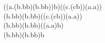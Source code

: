 \documentclass{article}
\begin{document}
\begin{flushleft}

((\lambda a.(\lambda b.b\:b)\:(\lambda b.b\:b))\:b)\:((\lambda c.(c\:b))\:(\lambda a.a)) \rightarrow \\ 
(\lambda b.b\:b)\:(\lambda b.b\:b)\:((\lambda c.(c\:b))\:(\lambda a.a)) \rightarrow \\ 
(\lambda b.b\:b)\:(\lambda b.b\:b)\:((\lambda a.a)\:b) \rightarrow \\ 
(\lambda b.b\:b)\:(\lambda b.b\:b)\:b

\end{flushleft}
\end{document}
